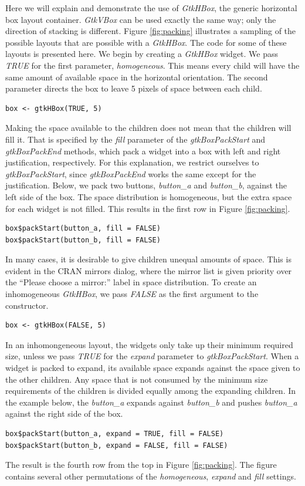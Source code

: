 \documentclass[article]{jss}
\begin{document}
Here we will explain and demonstrate the use of \emph{GtkHBox}, the generic
horizontal box layout container. \emph{GtkVBox} can be used exactly the same way;
only the direction of stacking is different. Figure \ref{fig:packing} illustrates
a sampling of the possible layouts that are possible with a \emph{GtkHBox}.
The code for some of these layouts is presented here.
We begin by creating a \emph{GtkHBox} widget. We pass \emph{TRUE} for the
first parameter, \emph{homogeneous}. This means every child will have the
same amount of available space in the horizontal orientation. The second 
parameter directs the box to leave 5 pixels of space between each child. 
\begin{verbatim}
box <- gtkHBox(TRUE, 5)
\end{verbatim}
Making the space available to the children does not mean that the children 
will fill it. That is specified by the \emph{fill} parameter of the 
\emph{gtkBoxPackStart} and \emph{gtkBoxPackEnd} methods, which pack a widget 
into a box with left and right justification, respectively. For this explanation,
we restrict ourselves to \emph{gtkBoxPackStart}, since \emph{gtkBoxPackEnd}
works the same except for the justification. Below, we pack two buttons, 
\emph{button\_a} and \emph{button\_b}, against
the left side of the box. The space distribution is homogeneous, but the
extra space for each widget is not filled. This results in the first row in 
Figure \ref{fig:packing}.
\begin{verbatim}
box$packStart(button_a, fill = FALSE)
box$packStart(button_b, fill = FALSE)
\end{verbatim}

In many cases, it is desirable to give children unequal amounts of space.
This is evident in the CRAN mirrors dialog, where the mirror list is given
priority over the ``Please choose a mirror:'' label in space distribution.
To create an inhomogeneous \emph{GtkHBox}, we pass \emph{FALSE} as the first
argument to the constructor.
\begin{verbatim}
box <- gtkHBox(FALSE, 5)
\end{verbatim}
In an inhomongeneous layout, the widgets only take up their minimum required
size, unless we pass \emph{TRUE} for the \emph{expand} parameter to
\emph{gtkBoxPackStart}. When a widget is packed to expand, its available space
expands against the space given to the other children. Any space that is
not consumed by the minimum size requirements of the children is divided
equally among the expanding children. In the example below, the \emph{button\_a}
expands against \emph{button\_b} and pushes \emph{button\_a} against the right 
side of the box.
\begin{verbatim}
box$packStart(button_a, expand = TRUE, fill = FALSE)
box$packStart(button_b, expand = FALSE, fill = FALSE)
\end{verbatim}
The result is the fourth row from the top in Figure \ref{fig:packing}. The
figure contains several other permutations of the \emph{homogeneous}, \emph{expand} 
and \emph{fill} settings.
\end{document}
